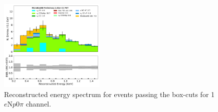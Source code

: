 \documentclass[a4paper]{article}
\newcommand{\npsel}{1$e$N$p$0$\pi$ }
\begin{document}
\begin{figure}[ht]
\begin{center}
\includegraphics[width=0.45\textwidth]{1eNp/reco_e_01162020_box_RUN1.pdf}
\caption{\label{fig:1eNp:box:RUN1} Reconstructed energy spectrum for events passing the box-cuts for \npsel channel.}
\end{center}
\end{figure}
\end{document}
